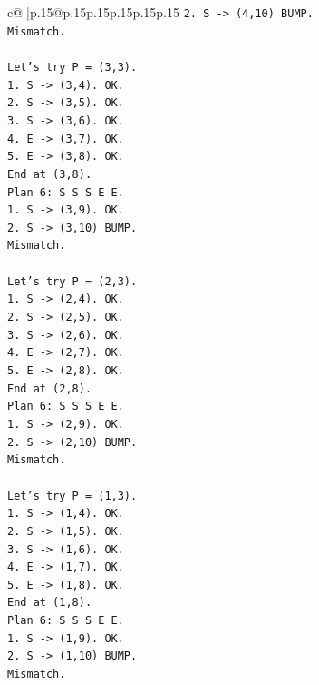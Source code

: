 \documentclass{article}
\begin{document}
{\begin{supertabular}{c@{$\;$}|p{.15\linewidth}@{}p{.15\linewidth}p{.15\linewidth}p{.15\linewidth}p{.15\linewidth}p{.15\linewidth}}
{{{\texttt{2. S {-}> (4,10) BUMP.} \\
\texttt{Mismatch.} \\
\\ 
\texttt{Let's try P = (3,3).} \\
\texttt{1. S {-}> (3,4). OK.} \\
\texttt{2. S {-}> (3,5). OK.} \\
\texttt{3. S {-}> (3,6). OK.} \\
\texttt{4. E {-}> (3,7). OK.} \\
\texttt{5. E {-}> (3,8). OK.} \\
\texttt{End at (3,8).} \\
\texttt{Plan 6: S S S E E.} \\
\texttt{1. S {-}> (3,9). OK.} \\
\texttt{2. S {-}> (3,10) BUMP.} \\
\texttt{Mismatch.} \\
\\ 
\texttt{Let's try P = (2,3).} \\
\texttt{1. S {-}> (2,4). OK.} \\
\texttt{2. S {-}> (2,5). OK.} \\
\texttt{3. S {-}> (2,6). OK.} \\
\texttt{4. E {-}> (2,7). OK.} \\
\texttt{5. E {-}> (2,8). OK.} \\
\texttt{End at (2,8).} \\
\texttt{Plan 6: S S S E E.} \\
\texttt{1. S {-}> (2,9). OK.} \\
\texttt{2. S {-}> (2,10) BUMP.} \\
\texttt{Mismatch.} \\
\\ 
\texttt{Let's try P = (1,3).} \\
\texttt{1. S {-}> (1,4). OK.} \\
\texttt{2. S {-}> (1,5). OK.} \\
\texttt{3. S {-}> (1,6). OK.} \\
\texttt{4. E {-}> (1,7). OK.} \\
\texttt{5. E {-}> (1,8). OK.} \\
\texttt{End at (1,8).} \\
\texttt{Plan 6: S S S E E.} \\
\texttt{1. S {-}> (1,9). OK.} \\
\texttt{2. S {-}> (1,10) BUMP.} \\
\texttt{Mismatch.} \\
}}}
\end{supertabular}}
\end{document}
